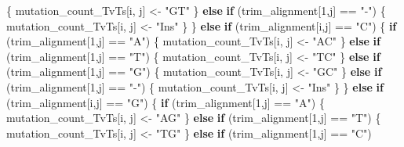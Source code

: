 \documentclass[
]{article}
\newenvironment{Shaded}{\begin{snugshade}}{\end{snugshade}}
\newcommand{\ControlFlowTok}[1]{\textcolor[rgb]{0.13,0.29,0.53}{\textbf{#1}}}
\newcommand{\DecValTok}[1]{\textcolor[rgb]{0.00,0.00,0.81}{#1}}
\newcommand{\NormalTok}[1]{#1}
\newcommand{\OtherTok}[1]{\textcolor[rgb]{0.56,0.35,0.01}{#1}}
\newcommand{\SpecialCharTok}[1]{\textcolor[rgb]{0.00,0.00,0.00}{#1}}
\newcommand{\StringTok}[1]{\textcolor[rgb]{0.31,0.60,0.02}{#1}}
\begin{document}
\begin{Shaded}
\begin{Highlighting}[]
\NormalTok{      \{}
\NormalTok{        mutation\_count\_TvTs[i, j] }\OtherTok{\textless{}{-}} \StringTok{"GT"}
\NormalTok{      \}}
      \ControlFlowTok{else} \ControlFlowTok{if}\NormalTok{ (trim\_alignment[}\DecValTok{1}\NormalTok{,j] }\SpecialCharTok{==} \StringTok{"{-}"}\NormalTok{)}
\NormalTok{      \{}
\NormalTok{        mutation\_count\_TvTs[i, j] }\OtherTok{\textless{}{-}} \StringTok{"Ins"}
\NormalTok{      \}}
\NormalTok{    \}}
    \ControlFlowTok{else} \ControlFlowTok{if}\NormalTok{ (trim\_alignment[i,j] }\SpecialCharTok{==} \StringTok{"C"}\NormalTok{)}
\NormalTok{    \{}
      \ControlFlowTok{if}\NormalTok{ (trim\_alignment[}\DecValTok{1}\NormalTok{,j] }\SpecialCharTok{==} \StringTok{"A"}\NormalTok{)}
\NormalTok{      \{}
\NormalTok{        mutation\_count\_TvTs[i, j] }\OtherTok{\textless{}{-}} \StringTok{"AC"}
\NormalTok{      \}}
      \ControlFlowTok{else} \ControlFlowTok{if}\NormalTok{ (trim\_alignment[}\DecValTok{1}\NormalTok{,j] }\SpecialCharTok{==} \StringTok{"T"}\NormalTok{)}
\NormalTok{      \{}
\NormalTok{        mutation\_count\_TvTs[i, j] }\OtherTok{\textless{}{-}} \StringTok{"TC"}
\NormalTok{      \}}
      \ControlFlowTok{else} \ControlFlowTok{if}\NormalTok{ (trim\_alignment[}\DecValTok{1}\NormalTok{,j] }\SpecialCharTok{==} \StringTok{"G"}\NormalTok{)}
\NormalTok{      \{}
\NormalTok{        mutation\_count\_TvTs[i, j] }\OtherTok{\textless{}{-}} \StringTok{"GC"}
\NormalTok{      \}}
      \ControlFlowTok{else} \ControlFlowTok{if}\NormalTok{ (trim\_alignment[}\DecValTok{1}\NormalTok{,j] }\SpecialCharTok{==} \StringTok{"{-}"}\NormalTok{)}
\NormalTok{      \{}
\NormalTok{        mutation\_count\_TvTs[i, j] }\OtherTok{\textless{}{-}} \StringTok{"Ins"}
\NormalTok{      \}}
\NormalTok{    \}}
    \ControlFlowTok{else} \ControlFlowTok{if}\NormalTok{ (trim\_alignment[i,j] }\SpecialCharTok{==} \StringTok{"G"}\NormalTok{)}
\NormalTok{    \{}
      \ControlFlowTok{if}\NormalTok{ (trim\_alignment[}\DecValTok{1}\NormalTok{,j] }\SpecialCharTok{==} \StringTok{"A"}\NormalTok{)}
\NormalTok{      \{}
\NormalTok{        mutation\_count\_TvTs[i, j] }\OtherTok{\textless{}{-}} \StringTok{"AG"}
\NormalTok{      \}}
      \ControlFlowTok{else} \ControlFlowTok{if}\NormalTok{ (trim\_alignment[}\DecValTok{1}\NormalTok{,j] }\SpecialCharTok{==} \StringTok{"T"}\NormalTok{)}
\NormalTok{      \{}
\NormalTok{        mutation\_count\_TvTs[i, j] }\OtherTok{\textless{}{-}} \StringTok{"TG"}
\NormalTok{      \}}
      \ControlFlowTok{else} \ControlFlowTok{if}\NormalTok{ (trim\_alignment[}\DecValTok{1}\NormalTok{,j] }\SpecialCharTok{==} \StringTok{"C"}\NormalTok{)}

\end{Highlighting}
\end{Shaded}
\end{document}
